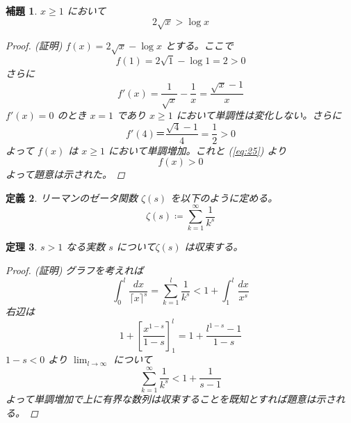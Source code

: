 \documentclass[12pt, a4j]{ltjsarticle}
\newtheorem{thm}{定理}
\newtheorem{lem}[thm]{補題}
\newtheorem{defi}[thm]{定義}
\begin{document}
\vspace{1cm}

\begin{lem}$x\ge 1$ において
\begin{equation}
2\sqrt{x} > \log x \label{eq:25}
\end{equation}
\begin{proof}
(証明) $f(x) = 2\sqrt{x} - \log x$ とする。ここで
\begin{equation}
f(1) = 2\sqrt{1} - \log 1 = 2 > 0
\end{equation}
さらに
\begin{equation}
f'(x) = \frac{1}{\sqrt{x}} - \frac{1}{x} = \frac{\sqrt{x}-1}{x}
\end{equation}
$f'(x)=0$ のとき $x=1$ であり $x\ge 1$ において単調性は変化しない。さらに
\begin{equation}
f'(4)＝\frac{\sqrt{4}-1}{4}=\frac{1}{2}>0
\end{equation}
よって $f(x)$ は $x\ge 1$ において単調増加。これと (\ref{eq:25}) より
\begin{equation}
f(x)>0
\end{equation}
よって題意は示された。
\end{proof}
\end{lem}

\vspace{1cm}

\begin{defi}
リーマンのゼータ関数 $\zeta(s)$ を以下のように定める。
\begin{equation}
\zeta(s)\coloneqq\sum_{k=1}^{\infty}\dfrac{1}{k^s}
\end{equation}
\end{defi}

\vspace{1cm}

\begin{thm}$s>1$ なる実数 $s$ について$\zeta(s)$ は収束する。\label{thm:19}
\begin{proof}
(証明) グラフを考えれば
\begin{equation}
\int_0^l\frac{dx}{\lceil x \rceil^s} =  \sum_{k=1}^{l}\frac{1}{k^s} < 1+\int_1^l\frac{dx}{x^s}
\end{equation}
右辺は
\begin{equation}
1+\left[\dfrac{x^{1-s}}{1-s}\right]_{1}^l=1+\dfrac{l^{1-s}-1}{1-s}
\end{equation}
$1-s<0$ より $\lim_{l\rightarrow\infty}$ について
\begin{equation}
\sum_{k=1}^{\infty}\dfrac{1}{k^s} <1+\dfrac{1}{s-1}
\end{equation}
よって単調増加で上に有界な数列は収束することを既知とすれば題意は示される。
\end{proof}
\end{thm}
\end{document}
